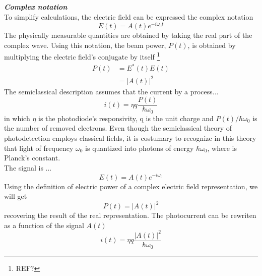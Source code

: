 \begin{bibunit}[plain]
\vspace{2em}
\noindent
{\bf \em Complex notation}\\
To simplify calculations, the electric field can be expressed the complex notation
\cite{fox2006} %
%
\begin{equation}
	E(t) = A(t) e^{-i \omega_0 t}
\end{equation}
%
%
The physically measurable quantities are obtained by taking the real part of the complex wave. Using this notation, the beam power, $P(t)$, is obtained by multiplying the electric field's conjugate by itself
\footnote{REF?}
%
\begin{align}
	P(t) &= E^{*}(t) E(t)\nonumber\\
         &= |A(t)|^2
\end{align}
The semiclassical description assumes that the current by a process...
%
\begin{equation}
	i(t) = \eta q \frac{P(t)}{\hbar \omega_0}
\end{equation}
in which $\eta$ is the photodiode's responsivity, q is the unit charge and $P(t)/\hbar \omega_0$ is the number of removed electrons. Even though the semiclassical theory of photodetection employs classical fields, it is costumary to recognize in this theory that light of frequency $\omega_0$ is quantized into photons of energy $\hbar \omega_0$, where is Planck's constant.
\cite{shapiro1985quantum} %
\\
The signal is ...
%
\begin{equation}
	E(t) = A(t) e^{-i \omega_0}
\end{equation}
%
Using the definition of electric power of a complex electric field representation, we will get
%
\begin{equation}
	P(t) = |A(t)|^2
	\label{eq:power}
\end{equation}
%
recovering the result of the real representation. The photocurrent can be rewriten as a function of the signal $A(t)$
%
\begin{equation}
	i(t) = \eta q \frac{|A(t)|^2}{\hbar \omega_0}
\end{equation}

\end{bibunit}
